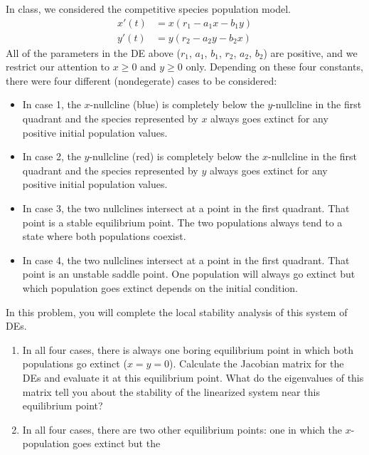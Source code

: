 \documentclass[12pt,letterpaper]{hmcpset}
\begin{document}
\begin{problem}[5]
    In class, we considered the competitive species population model.
    \begin{align*}
        x'(t)&=x(r_1-a_1x-b_1y)\\
        y'(t)&=y(r_2-a_2y-b_2x)
    \end{align*}
    All of the parameters in the DE above ($r_1$, $a_1$, $b_1$, $r_2$,
    $a_2$, $b_2$) are positive, and we restrict our attention to
    $x\geq0$ and $y\geq0$ only.  Depending on these four constants,
    there were four different (nondegerate) cases to be considered:
    \begin{itemize}
        \item In case 1, the $x$-nullcline (blue) is completely below the
            $y$-nullcline in the first quadrant and the species represented by
            $x$ always goes extinct for any positive initial population values.
        \item In case 2, the $y$-nullcline (red) is completely below
            the $x$-nullcline in the first quadrant and the species
            represented by $y$ always goes extinct for any positive
            initial population values.
        \item In case 3, the two nullclines intersect at a point in
            the first quadrant. That point is a stable equilibrium
            point. The two populations always tend to a state where both
            populations coexist.
        \item In case 4, the two nullclines intersect at a point in
            the first quadrant. That point is an unstable saddle
            point. One population will always go extinct but which
            population goes extinct depends on the initial condition.
    \end{itemize}
    In this problem, you will complete the local stability analysis of
    this system of DEs.
    \begin{enumerate}
        \item In all four cases, there is always one boring
            equilibrium point in which both populations go extinct
            ($x=y=0$). Calculate the Jacobian matrix for the DEs and
            evaluate it at this equilibrium point. What do the
            eigenvalues of this matrix tell you about the stability of
            the linearized system near this equilibrium point?
        \item In all four cases, there are two other equilibrium
            points: one in which the $x$-population goes extinct but the

\end{enumerate}
\end{problem}
\end{document}
